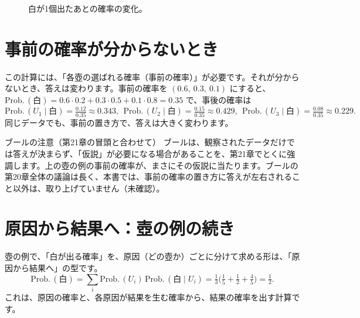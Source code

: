 \documentclass[a4paper,11pt,openany]{ltjsbook}
\newcommand{\Prob}{\mathrm{Prob.}\,}
\begin{document}
\begin{figure}[htbp]
\centering
{}
\caption{白が1個出たあとの確率の変化。}
\end{figure}

\section{事前の確率が分からないとき}

この計算には、「各壺の選ばれる確率（事前の確率）」が必要です。それが分からないとき、答えは変わります。事前の確率を $(0.6,\ 0.3,\ 0.1)$ にすると、$\Prob(\text{白})=0.6\cdot0.2+0.3\cdot0.5+0.1\cdot0.8=0.35$ で、事後の確率は
\[
\Prob(U_1\mid\text{白})=\tfrac{0.12}{0.35}\approx0.343,\ \ \Prob(U_2\mid\text{白})=\tfrac{0.15}{0.35}\approx0.429,\ \ \Prob(U_3\mid\text{白})=\tfrac{0.08}{0.35}\approx0.229 .
\]
同じデータでも、事前の置き方で、答えは大きく変わります。

\begin{notebox}{ブールの注意（第21章の冒頭と合わせて）}
ブールは、観察されたデータだけでは答えが決まらず、「仮説」が必要になる場合があることを、第21章でとくに強調します。上の壺の例の事前の確率が、まさにその仮説に当たります。ブールの第20章全体の議論は長く、本書では、事前の確率の置き方に答えが左右されること以外は、取り上げていません（未確認）。
\end{notebox}

\section{原因から結果へ：壺の例の続き}

壺の例で、「白が出る確率」を、原因（どの壺か）ごとに分けて求める形は、「原因から結果へ」の型です。
\[
\Prob(\text{白})=\sum_i\Prob(U_i)\,\Prob(\text{白}\mid U_i)=\tfrac13\bigl(\tfrac15+\tfrac12+\tfrac45\bigr)=\tfrac12 .
\]
これは、原因の確率と、各原因が結果を生む確率から、結果の確率を出す計算です。
\end{document}
